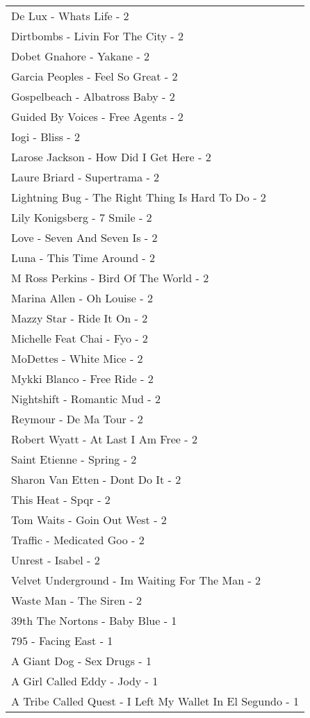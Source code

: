 \documentclass[
]{article}
\begin{document}
\begin{longtable}{l}
De Lux - Whats Life - 2 \\ 
Dirtbombs - Livin For The City - 2 \\ 
Dobet Gnahore - Yakane - 2 \\ 
Garcia Peoples - Feel So Great - 2 \\ 
Gospelbeach - Albatross Baby - 2 \\ 
Guided By Voices - Free Agents - 2 \\ 
Iogi - Bliss - 2 \\ 
Larose Jackson - How Did I Get Here - 2 \\ 
Laure Briard - Supertrama - 2 \\ 
Lightning Bug - The Right Thing Is Hard To Do - 2 \\ 
Lily Konigsberg - 7 Smile - 2 \\ 
Love - Seven And Seven Is - 2 \\ 
Luna - This Time Around - 2 \\ 
M Ross Perkins - Bird Of The World - 2 \\ 
Marina Allen - Oh Louise - 2 \\ 
Mazzy Star - Ride It On - 2 \\ 
Michelle Feat Chai - Fyo - 2 \\ 
MoDettes - White Mice - 2 \\ 
Mykki Blanco - Free Ride - 2 \\ 
Nightshift - Romantic Mud - 2 \\ 
Reymour - De Ma Tour - 2 \\ 
Robert Wyatt - At Last I Am Free - 2 \\ 
Saint Etienne - Spring - 2 \\ 
Sharon Van Etten - Dont Do It - 2 \\ 
This Heat - Spqr - 2 \\ 
Tom Waits - Goin Out West - 2 \\ 
Traffic - Medicated Goo - 2 \\ 
Unrest - Isabel - 2 \\ 
Velvet Underground - Im Waiting For The Man - 2 \\ 
Waste Man - The Siren - 2 \\ 
39th The Nortons - Baby Blue - 1 \\ 
795 - Facing East - 1 \\ 
A Giant Dog - Sex Drugs - 1 \\ 
A Girl Called Eddy - Jody - 1 \\ 
A Tribe Called Quest - I Left My Wallet In El Segundo - 1 \\ 

\end{longtable}
\end{document}
